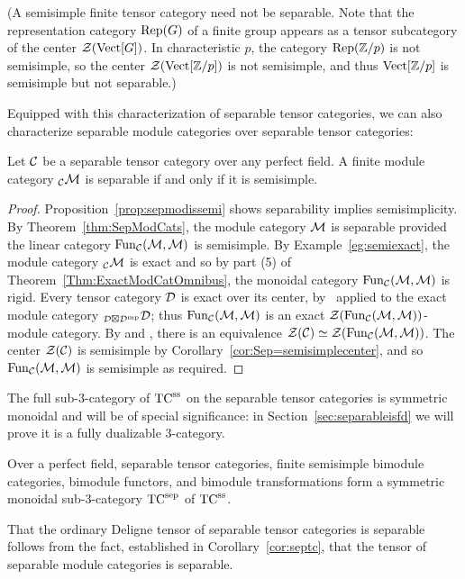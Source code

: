\documentclass{amsart}
\begin{document}
(A semisimple finite tensor category need not be separable.  Note that the representation category $\mathrm{Rep}(G)$ of a finite group appears as a tensor subcategory of the center $\mathcal Z(\mathrm{Vect}[G])$.  In characteristic $p$, the category $\mathrm{Rep}(\mathbb Z/p)$ is not semisimple, so the center $\mathcal Z(\mathrm{Vect}[\mathbb Z/p])$ is not semisimple, and thus $\mathrm{Vect}[\mathbb Z/p]$ is semisimple but not separable.)

Equipped with this characterization of separable tensor categories, we can also characterize separable module categories over separable tensor categories:

\begin{proposition} \label{prop:SSModuleCatsAreSep}
Let $\mathcal C$ be a separable tensor category over any perfect field.  A finite module category ${}_\mathcal C \mathcal M$ is separable if and only if it is semisimple.
\end{proposition}
\begin{proof}
Proposition~\ref{prop:sepmodissemi} shows separability implies semisimplicity.  By Theorem~\ref{thm:SepModCats}, the module category $\mathcal M$ is separable provided the linear category $\operatorname{Fun}_\mathcal C(\mathcal M,\mathcal M)$ is semisimple.  By Example~\ref{eg:semiexact}, the module category ${}_\mathcal C \mathcal M$ is exact and so by part (5) of Theorem~\ref{Thm:ExactModCatOmnibus}, the monoidal category $\operatorname{Fun}_\mathcal C(\mathcal M,\mathcal M)$ is rigid. Every tensor category $\mathcal D$ is exact over its center, by~\cite[Lemma 2.14.4]{EGNO} applied to the exact module category ${}_{\mathcal D \boxtimes \mathcal D^{\mathrm{mp}}} \mathcal D$; thus $\operatorname{Fun}_\mathcal C(\mathcal M,\mathcal M)$ is an exact $\mathcal Z(\operatorname{Fun}_\mathcal C(\mathcal M,\mathcal M))$-module category.  By \cite{scha} and \cite[Cor. 3.35]{EO-ftc}, there is an equivalence $\mathcal Z(\mathcal C) \simeq \mathcal Z(\operatorname{Fun}_\mathcal C(\mathcal M,\mathcal M))$.  The center $\mathcal Z(\mathcal C)$ is semisimple by Corollary~\ref{cor:Sep=semisimplecenter}, and so $\operatorname{Fun}_\mathcal C(\mathcal M,\mathcal M)$ is semisimple as required.
\end{proof}

The full sub-3-category of ${\mathrm{TC}^{\mathrm{ss}}}$ on the separable tensor categories is symmetric monoidal and will be of special significance: in Section~\ref{sec:separableisfd} we will prove it is a fully dualizable 3-category. 
\begin{corollary} \label{cor:tcsepexists}
Over a perfect field, separable tensor categories, finite semisimple bimodule categories, bimodule functors, and bimodule transformations form a symmetric monoidal sub-3-category ${\mathrm{TC}^{\mathrm{sep}}}$ of ${\mathrm{TC}^{\mathrm{ss}}}$.
\end{corollary}
\nid That the ordinary Deligne tensor of separable tensor categories is separable follows from the fact, established in Corollary~\ref{cor:septc}, that the tensor of separable module categories is separable.
\end{document}
